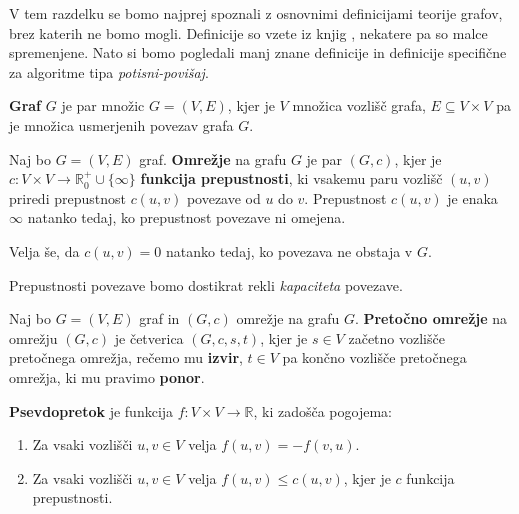 \documentclass[mat1]{fmfdelo}
\begin{document}
V tem razdelku se bomo najprej spoznali z osnovnimi definicijami teorije grafov, brez katerih ne bomo mogli. Definicije so vzete iz knjig \cite{clrs, uvtg}, nekatere pa so malce spremenjene. Nato si bomo pogledali manj znane definicije in definicije specifične za algoritme tipa \textit{potisni-povišaj}.

\begin{definicija}
\textbf{Graf} $G$ je par množic $G = (V,E)$, kjer je $V$ množica vozlišč grafa, $E \subseteq V \times V$ pa je množica usmerjenih povezav grafa $G$.
\end{definicija}

\begin{definicija}\label{def:omrezjeprepustnost}
Naj bo $G = (V, E)$ graf. \textbf{Omrežje} na grafu $G$ je par $(G, c)$, kjer je $c \colon V \times V \rightarrow \mathbb{R}^+_0 \cup \{\infty\}$ \textbf{funkcija prepustnosti}, ki vsakemu paru vozlišč $(u,v)$ priredi prepustnost $c(u,v)$ povezave od $u$ do $v$. Prepustnost $c(u,v)$ je enaka $\infty$ natanko tedaj, ko prepustnost povezave ni omejena.

Velja še, da $c(u,v)=0$ natanko tedaj, ko povezava ne obstaja v $G$.
\end{definicija}

\begin{opomba}
Prepustnosti povezave bomo dostikrat rekli \textit{kapaciteta} povezave.
\end{opomba}

\begin{definicija}
Naj bo $G = (V,E)$ graf in $(G,c)$ omrežje na grafu $G$. \textbf{Pretočno omrežje} na omrežju $(G,c)$ je četverica $(G,c,s,t)$, kjer je $s\in V$ začetno vozlišče pretočnega omrežja, rečemo mu \textbf{izvir}, $t\in V$ pa končno vozlišče pretočnega omrežja, ki mu pravimo \textbf{ponor}.
\end{definicija}

\begin{definicija} \label{def:psevdopretok}
\textbf{Psevdopretok} je funkcija $f \colon V \times V \rightarrow \mathbb{R}$, ki zadošča pogojema:
\begin{enumerate}
\item Za vsaki vozlišči $u,v \in V$ velja $f(u,v) = - f(v,u)$.
\item Za vsaki vozlišči $u,v \in V$ velja $f(u,v) \leq c(u,v)$, kjer je $c$ funkcija pre\-pu\-stno\-sti.
\end{enumerate}
\end{definicija}
\end{document}
